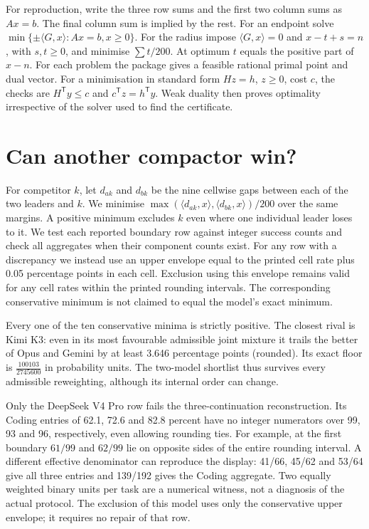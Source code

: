 \documentclass[11pt]{article}
\begin{document}
For reproduction, write the three row sums and the first two column sums as $Ax=b$. The final column sum is implied by the rest. For an endpoint solve $\min\{\pm\langle G,x\rangle:Ax=b,x\geq0\}$. For the radius impose $\langle G,x\rangle=0$ and $x-t+s=n$, with $s,t\geq0$, and minimise $\sum t/200$. At optimum $t$ equals the positive part of $x-n$. For each problem the package gives a feasible rational primal point and dual vector. For a minimisation in standard form $Hz=h$, $z\geq0$, cost $c$, the checks are $H^\mathsf{T}y\leq c$ and $c^\mathsf{T}z=h^\mathsf{T}y$. Weak duality then proves optimality irrespective of the solver used to find the certificate.

\section{Can another compactor win?}
For competitor $k$, let $d_{ak}$ and $d_{bk}$ be the nine cellwise gaps between each of the two leaders and $k$. We minimise $\max(\langle d_{ak},x\rangle,\langle d_{bk},x\rangle)/200$ over the same margins. A positive minimum excludes $k$ even where one individual leader loses to it. We test each reported boundary row against integer success counts and check all aggregates when their component counts exist. For any row with a discrepancy we instead use an upper envelope equal to the printed cell rate plus 0.05 percentage points in each cell. Exclusion using this envelope remains valid for any cell rates within the printed rounding intervals. The corresponding conservative minimum is not claimed to equal the model's exact minimum.
 
Every one of the ten conservative minima is strictly positive. The closest rival is Kimi K3: even in its most favourable admissible joint mixture it trails the better of Opus and Gemini by at least 3.646 percentage points (rounded). Its exact floor is $\frac{100103}{2745600}$ in probability units. The two-model shortlist thus survives every admissible reweighting, although its internal order can change.

Only the DeepSeek V4 Pro row fails the three-continuation reconstruction. Its Coding entries of 62.1, 72.6 and 82.8 percent have no integer numerators over 99, 93 and 96, respectively, even allowing rounding ties. For example, at the first boundary $61/99$ and $62/99$ lie on opposite sides of the entire rounding interval. A different effective denominator can reproduce the display: 41/66, 45/62 and 53/64 give all three entries and 139/192 gives the Coding aggregate. Two equally weighted binary units per task are a numerical witness, not a diagnosis of the actual protocol. The exclusion of this model uses only the conservative upper envelope; it requires no repair of that row.
\end{document}
